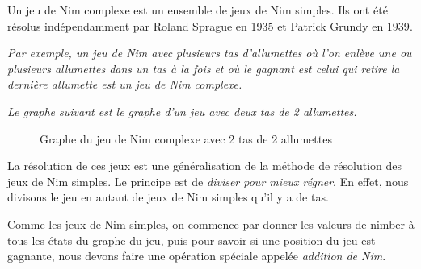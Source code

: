     Un jeu de Nim complexe est un ensemble de jeux de Nim simples. Ils ont été résolus indépendamment par Roland Sprague en 1935 et Patrick Grundy en 1939\cite{tsgE}.

    \textit{
      Par exemple, un jeu de Nim avec plusieurs tas d'allumettes où l'on enlève une ou plusieurs allumettes dans un tas à la fois et où le gagnant est celui qui retire la dernière allumette est un jeu de Nim complexe.
    }

    \textit{
      Le graphe suivant est le graphe d'un jeu avec deux tas de 2 allumettes.
    }

     \begin{figure}[h]
        \centering
      \caption{Graphe du jeu de Nim complexe avec 2 tas de 2 allumettes}
    \end{figure}

    La résolution de ces jeux est une généralisation de la méthode de résolution des jeux de Nim simples. Le principe est de \textit{diviser pour mieux régner}. En effet, nous divisons le jeu en autant de jeux de Nim simples qu'il y a de tas.

    Comme les jeux de Nim simples, on commence par donner les valeurs de nimber à tous les états du graphe du jeu, puis pour savoir si une position du jeu est gagnante, nous devons faire une opération spéciale appelée \textit{addition de Nim}.

